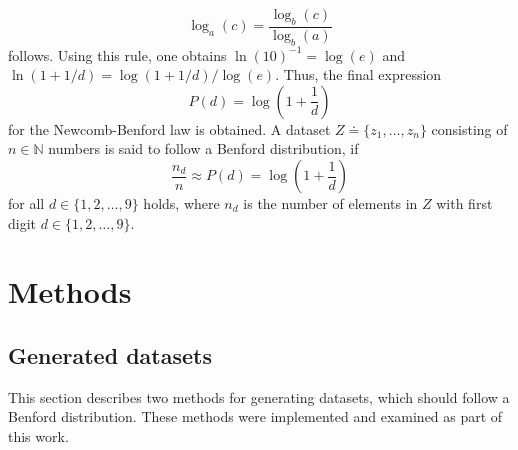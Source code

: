 \documentclass[a4paper,11pt, twocolumn]{article}
\begin{document}
\begin{equation}
\log_a(c) = \frac{\log_b(c)}{\log_b(a)}
\end{equation} follows. Using this rule, one obtains $\ln(10)^{-1} = \log(e)$ and $\ln(1+1/d) = \log(1+1/d)/\log(e)$. Thus, the final expression \begin{equation}
P(d) = \log\left(1 + \frac{1}{d}\right)
\end{equation} for the Newcomb-Benford law is obtained. A dataset $Z \doteq \{z_1,\dots,z_n\}$ consisting of $n \in \mathbb{N}$ numbers is said to follow a Benford distribution, if \begin{equation}
\frac{n_{d}}{n} \approx P(d) = \log\left(1+\frac{1}{d}\right)
\end{equation} for all $d \in \{1,2,\dots,9\}$ holds, where $n_{d}$ is the number of elements in $Z$ with first digit $d \in \{1,2,\dots,9\}$.


\section{Methods}
\subsection{Generated datasets}
This section describes two methods for generating datasets, which should follow a Benford distribution. These methods were implemented and examined as part of this work.

\end{document}
